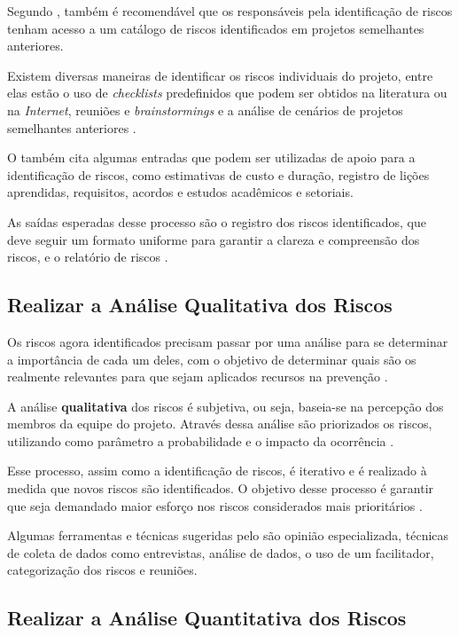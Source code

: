 \documentclass[
    12pt,       %
    openright,      %
    twoside,      %
    a4paper,      %
    english,      %
    french,       %
    spanish,      %
    brazil,       %
    ]{abntex2}
\begin{document}
Segundo , também é recomendável que os responsáveis pela identificação de riscos tenham acesso a um catálogo de riscos identificados em projetos semelhantes anteriores. 

Existem diversas maneiras de identificar os riscos individuais do projeto, entre elas estão o uso de \textit{checklists} predefinidos que podem ser obtidos na literatura ou na \textit{Internet}, reuniões e \textit{brainstormings} e a análise de cenários de projetos semelhantes anteriores \cite{WAZLAWICK:2013}.

O  também cita algumas entradas que podem ser utilizadas de apoio para a identificação de riscos, como estimativas de custo e duração, registro de lições aprendidas, requisitos, acordos e estudos acadêmicos e setoriais.

As saídas esperadas desse processo são o registro dos riscos identificados, que deve seguir um formato uniforme para garantir a clareza e compreensão dos riscos, e o relatório de riscos \cite{PMBOK:2017}. 

\subsection{Realizar a Análise Qualitativa dos Riscos}

Os riscos agora identificados precisam passar por uma análise para se determinar a importância de cada um deles, com o objetivo de determinar quais são os realmente relevantes para que sejam aplicados recursos na prevenção \cite{WAZLAWICK:2013}.

A análise \textbf{qualitativa} dos riscos é subjetiva, ou seja, baseia-se na percepção dos membros da equipe do projeto. Através dessa análise são priorizados os riscos, utilizando como parâmetro a probabilidade e o impacto da ocorrência \cite{PMBOK:2017}.

Esse processo, assim como a identificação de riscos, é iterativo e é realizado à medida que novos riscos são identificados. O objetivo desse processo é garantir que seja demandado maior esforço nos riscos considerados mais prioritários \cite{PMBOK:2017}.

Algumas ferramentas e técnicas sugeridas pelo  são opinião especializada, técnicas de coleta de dados como entrevistas, análise de dados, o uso de um facilitador, categorização dos riscos e reuniões.

\subsection{Realizar a Análise Quantitativa dos Riscos}
\end{document}
